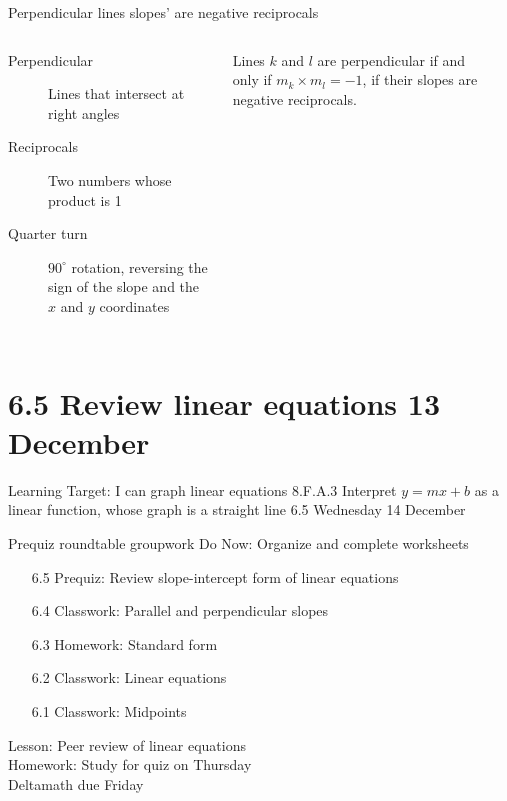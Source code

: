 \begin{frame}{Perpendicular lines slopes' are negative reciprocals}
  \begin{columns}
    \begin{description}
      \item[Perpendicular] Lines that intersect at right angles
      \item[Reciprocals] Two numbers whose product is 1
      \item[Quarter turn] $90^\circ$ rotation, reversing the sign of the slope and the $x$ and $y$ coordinates
    \end{description} \bigskip
    Lines $k$ and $l$ are perpendicular if and only if $m_k \times m_l = -1$, if their slopes are negative reciprocals.
    \begin{flushright}
    \end{flushright}
  \end{columns}
\end{frame}

\section{6.5 Review linear equations \hfill 13 December \,}
\begin{frame}{Learning Target: I can graph linear equations}
  {8.F.A.3 Interpret $y=mx+b$ as a linear function, whose graph is a straight line \hfill \alert{6.5 Wednesday 14 December}}
  \begin{block}{Prequiz roundtable groupwork}
    Do Now: Organize and complete worksheets
    \begin{itemize}
      \item[6.5] Prequiz: Review slope-intercept form of linear equations
      \item[6.4] Classwork: Parallel and perpendicular slopes
      \item[6.3] Homework: Standard form
      \item[6.2] Classwork: Linear equations
      \item[6.1] Classwork: Midpoints
    \end{itemize}
      Lesson: Peer review of linear equations \\
      Homework: Study for quiz on Thursday \\
      Deltamath due Friday
  \end{block}
\end{frame}



